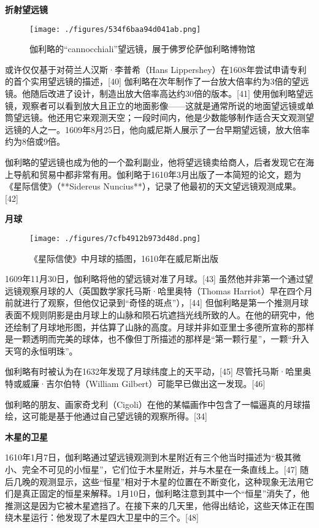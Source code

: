 \textbf{折射望远镜}
\begin{figure}[ht]
\centering
\texttt{[image: ./figures/534f6baa94d041ab.png]}
\caption{伽利略的“cannocchiali”望远镜，展于佛罗伦萨伽利略博物馆} \label{fig_JLL_3}
\end{figure}
或许仅仅基于对荷兰人汉斯·李普希（Hans Lippershey）在1608年尝试申请专利的首个实用望远镜的描述，[40] 伽利略在次年制作了一台放大倍率约为3倍的望远镜。他随后改进了设计，制造出放大倍率高达约30倍的版本。[41] 使用伽利略望远镜，观察者可以看到放大且正立的地面影像——这就是通常所说的地面望远镜或单筒望远镜。他还用它来观测天空；一段时间内，他是少数能够制作适合天文观测望远镜的人之一。1609年8月25日，他向威尼斯人展示了一台早期望远镜，放大倍率约为8倍或9倍。  

伽利略的望远镜也成为他的一个盈利副业，他将望远镜卖给商人，后者发现它在海上导航和贸易中都非常有用。伽利略于1610年3月出版了一本简短的论文，题为《星际信使》（**Sidereus Nuncius**），记录了他最初的天文望远镜观测成果。[42]

\textbf{月球}
\begin{figure}[ht]
\centering
\texttt{[image: ./figures/7cfb4912b973d48d.png]}
\caption{《星际信使》中月球的插图，1610年在威尼斯出版} \label{fig_JLL_4}
\end{figure}
1609年11月30日，伽利略将他的望远镜对准了月球。[43] 虽然他并非第一个通过望远镜观察月球的人（英国数学家托马斯·哈里奥特（Thomas Harriot）早在四个月前就进行了观察，但他仅记录到“奇怪的斑点”），[44] 但伽利略是第一个推测月球表面不规则阴影是由月球上的山脉和陨石坑遮挡光线所致的人。在他的研究中，他还绘制了月球地形图，并估算了山脉的高度。月球并非如亚里士多德所宣称的那样是一颗透明而完美的球体，也不像但丁所描述的那样是“第一颗行星”，一颗“升入天穹的永恒明珠”。  

伽利略有时被认为在1632年发现了月球纬度上的天平动，[45] 尽管托马斯·哈里奥特或威廉·吉尔伯特（William Gilbert）可能早已做出这一发现。[46]  

伽利略的朋友、画家奇戈利（Cigoli）在他的某幅画作中包含了一幅逼真的月球描绘，这可能是基于他通过自己望远镜的观察所得。[34]

\textbf{木星的卫星} 

1610年1月7日，伽利略通过望远镜观测到木星附近有三个他当时描述为“极其微小、完全不可见的小恒星”，它们位于木星附近，并与木星在一条直线上。[47] 随后几晚的观测显示，这些“恒星”相对于木星的位置在不断变化，这种现象无法用它们是真正固定的恒星来解释。1月10日，伽利略注意到其中一个“恒星”消失了，他推测这是因为它被木星遮挡了。在接下来的几天里，他得出结论，这些天体正在围绕木星运行：他发现了木星四大卫星中的三个。[48]  

